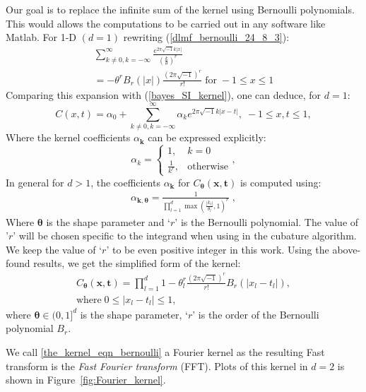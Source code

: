 \documentclass[twocolumn]{svjour3}          %
\newcommand{\bm}[1]{\boldsymbol{#1}}
\newcommand{\vtheta}{{\bm{\theta}}}
\newcommand{\vk}{\bm{k}}
\newcommand{\vt}{\bm{t}}
\newcommand{\vx}{\bm{x}}
\newcommand\figref{Figure~\ref}
\begin{document}
Our goal is to replace the infinite sum of the kernel using Bernoulli polynomials. This would allows the computations to be carried out in any software like Matlab.
For 1-D $(d=1)$ rewriting (\ref{dlmf_bernoulli_24_8_3}):
\begin{multline*}
\sum_{k \neq 0, k=-\infty}^\infty \frac{e^{2\pi\sqrt{-1} k |x|}}{ (\frac{k}{\theta})^{r}}
\\
=
-{\theta^r} B_{r}(|x|) \frac{(2 \pi \sqrt{-1})^{r}}{r!}
\; \text{for} \; -1 \leq x \leq 1
\end{multline*}
Comparing this expansion with (\ref{bayes_SI_kernel}), one can deduce, for $d=1$:
\[
C({x}, {t}) = 
\alpha_0 + \sum_{k \neq 0, k=-\infty}^\infty \alpha_k e^{2\pi\sqrt{-1} k |x-t|}   
, \; -1 \leq x,t \leq 1,
\]
Where the kernel coefficients ${\alpha}_{\vk}$ can be expressed explicitly:
\[
\alpha_k = 
\begin{cases}
1, & k=0 \\
\frac{1}{k^r}, & \text{otherwise}
\end{cases},
\]
In general for $d>1$, the coefficients $\alpha_{\vk}$ for $C_{\vtheta}(\vx,\vt)$ is computed using:
\begin{align*}
\alpha_{\vk, \vtheta} = \frac{1}{\prod_{l=1}^d \max(\frac{|k_l|}{\theta_l}, 1)^r} \; ,
\end{align*}
Where $\vtheta$ is the shape parameter and `$r$' is the Bernoulli polynomial. The value of '$r$' will be chosen specific to the integrand when using in the cubature algorithm. We keep the value of `$r$' to be even positive integer in this work.
Using the above-found results, we get the simplified form of the kernel:
\begin{multline}
\label{the_kernel_eqn_bernoulli}
C_\vtheta(\vx, \vt) =
 \prod_{l=1}^d
1 - \theta_l^r \frac{(2 \pi \sqrt{-1})^{r}}{r!} B_{r}( |{x_l-t_l}| ),
\\
\text{where} \; 0 \leq |x_l - t_l| \leq 1,
\end{multline}
where $\vtheta \in (0,1]^d$ is the {shape parameter}, `$r$' is the order of the Bernoulli polynomial $B_{r}$.

We call \eqref{the_kernel_eqn_bernoulli} a Fourier kernel as the resulting Fast transform is the \emph{Fast Fourier transform} (FFT). Plots of this kernel in $d=2$ is shown in \figref{fig:Fourier_kernel}.
\end{document}
